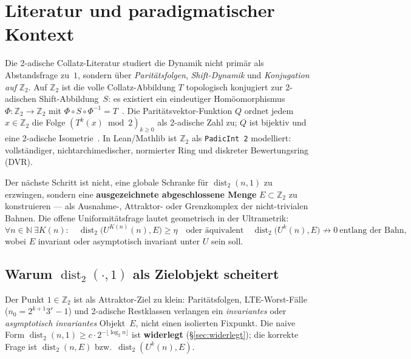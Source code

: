 \documentclass[12pt,a4paper]{article}
\newcommand{\N}{\mathbb{N}}
\newcommand{\Ztwo}{\mathbb{Z}_2}
\newcommand{\disttwo}{\operatorname{dist}_2}
\begin{document}
\section{Literatur und paradigmatischer Kontext}
\label{sec:literatur}

Die 2-adische Collatz-Literatur studiert die Dynamik nicht prim\"ar als
Abstandsfrage zu~$1$, sondern \"uber \emph{Parit\"atsfolgen}, \emph{Shift-Dynamik}
und \emph{Konjugation auf} $\Ztwo$.
Auf $\Ztwo$ ist die volle Collatz-Abbildung $T$ topologisch konjugiert zur
2-adischen Shift-Abbildung~$S$:
es existiert ein eindeutiger Hom\"oomorphismus $\Phi:\Ztwo\to\Ztwo$ mit
$\Phi\circ S\circ\Phi^{-1}=T$~\cite{BernsteinLagarias1996,Bernstein1994}.
Die Parit\"atsvektor-Funktion $Q$ ordnet jedem $x\in\Ztwo$ die Folge
$(T^k(x)\bmod 2)_{k\geq 0}$ als 2-adische Zahl zu; $Q$ ist bijektiv und
eine 2-adische Isometrie~\cite{Rozier2019,Lagarias1985}.
In Lean/Mathlib ist $\Ztwo$ als \texttt{PadicInt~2} modelliert: vollst\"andiger,
nichtarchimedischer, normierter Ring und diskreter Bewertungsring (DVR).

\begin{tcolorbox}[kern,title={Paradigmenwechsel: Zielraum der Uniformit\"atsfrage}]
Der n\"achste Schritt ist nicht, eine globale Schranke f\"ur $\disttwo(n,1)$
zu erzwingen, sondern eine \textbf{ausgezeichnete abgeschlossene Menge}
$E\subset\Ztwo$ zu konstruieren --- als Ausnahme-, Attraktor- oder
Grenzkomplex der nicht-trivialen Bahnen.
Die offene Uniformit\"atsfrage lautet geometrisch in der Ultrametrik:
\[
  \forall n\in\N\ \exists K(n):\quad \disttwo\bigl(U^{K(n)}(n),E\bigr)\geq\eta
  \quad\text{oder \"aquivalent}\quad
  \disttwo\bigl(U^k(n),E\bigr)\not\to 0\ \text{entlang der Bahn},
\]
wobei $E$ invariant oder asymptotisch invariant unter $U$ sein soll.
\end{tcolorbox}

\subsection{Warum $\disttwo(\cdot,1)$ als Zielobjekt scheitert}

Der Punkt $1\in\Ztwo$ ist als Attraktor-Ziel zu klein: Parit\"atsfolgen,
LTE-Worst-F\"alle ($n_0=2^{k+1}3^r-1$) und 2-adische Restklassen verlangen
ein \emph{invariantes} oder \emph{asymptotisch invariantes} Objekt~$E$,
nicht einen isolierten Fixpunkt.
Die naive Form $\disttwo(n,1)\geq c\cdot 2^{-\lfloor\log_2 n\rfloor}$ ist
\textbf{widerlegt} (\S\ref{sec:widerlegt}); die korrekte Frage ist
$\disttwo(n,E)$ bzw.\ $\disttwo(U^k(n),E)$.
\end{document}
